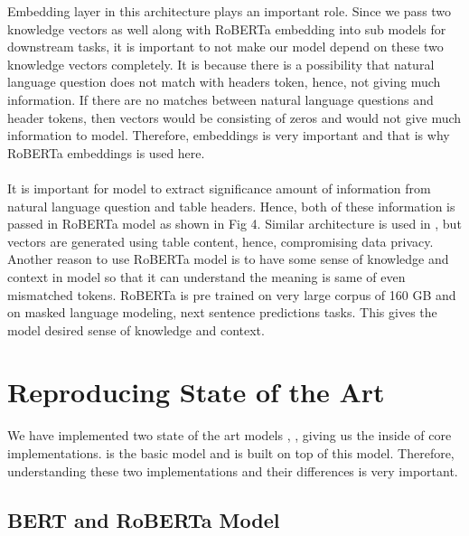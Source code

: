 \documentclass[12pt]{article}
\begin{document}
Embedding layer in this architecture plays an important role. Since we pass two knowledge vectors as well along with RoBERTa embedding into sub models for downstream tasks, it is important to not make our model depend on these two knowledge vectors completely. It is because there is a possibility that natural language question does not match with headers token, hence, not giving much information. If there are no matches between natural language questions and header tokens, then vectors would be consisting of zeros and would not give much information to model. Therefore, embeddings is very important and that is why RoBERTa embeddings is used here. 
\\
\\
It is important for model to extract significance amount of information from natural language question and table headers. Hence, both of these information is passed in RoBERTa model as shown in Fig 4. Similar architecture is used in \cite{guo2019content}, but vectors are generated using table content, hence, compromising data privacy. Another reason to use RoBERTa model is to have some sense of knowledge and context in model so that it can understand the meaning is same of even mismatched tokens. RoBERTa is pre trained on very large corpus of 160 GB and on masked language modeling, next sentence predictions tasks. This gives the model desired sense of knowledge and context. 


\section{Reproducing State of the Art}

We have implemented two state of the art models \cite{guo2019content}, \cite{liu2019roberta}, giving us the inside of core implementations. \cite{guo2019content} is the basic model and \cite{liu2019roberta} is built on top of this model. Therefore, understanding these two implementations and their differences is very important. 

\subsection{BERT and RoBERTa Model}
\end{document}
